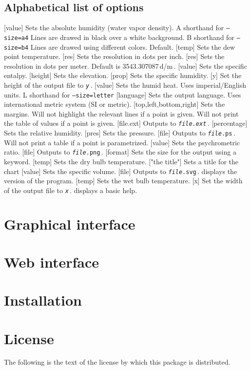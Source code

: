 \documentclass[letterpaper]{article}
\begin{document}
\subsection{Alphabetical list of options}
\begin{clioptions}
[value] Sets the absolute humidity (water vapor density).
\cliop A shorthand for \texttt{--size=a4}
 Lines are drawed in black over a white background.
\cliop B shorthand for \texttt{--size=b4}
 Lines are drawed using different colors. Default.
[temp] Sets the dew point temperature.
[res] Sets the resolution in dots per inch.
[res] Sets the resolution in dots per meter.
  Default is 3543.307087\,d/m\,.
[value] Sets the specific entalpy.
[height] Sets the elevation.
[prop] Sets the specific humidity.
[y] Set the height of the output file to \texttt{\textit{y}}\,.
[value] Sets the humid heat.
 Uses imperial/English units.
\cliop L shorthand for \texttt{--size=letter}
[language] Sets the output language.
 Uses international metric system (SI or metric).
[top,left,bottom,right] Sets the margins.
 Will not highlight the relevant lines if a point is given.
 Will not print the table of values if a point is given.
[file.ext] Outputs to \texttt{\textit{file.ext}}\,.
[percentage] Sets the relative humidity.
[pres] Sets the pressure.
[file] Outputs to \texttt{\textit{file}.ps}\,.
 Will not print a table if a point is parametrized.
[value] Sets the psychrometric ratio.
[file] Outputs to \texttt{\textit{file}.png}\,.
[format] Sets the size for the output using a keyword.
[temp] Sets the dry bulb temperature.
["the title"] Sets a title for the chart
[value] Sets the specific volume.
[file] Outputs to \texttt{\textit{file}.svg}\,.
 displays the version of the program.
[temp] Sets the wet bulb temperature.
[x] Set the width of the output file to \texttt{\textit{x}}\,.
 displays a basic help.
\end{clioptions}
\section{Graphical interface}
\section{Web interface}
\section{Installation}
\section{License}
The following is the text of the license by which this package is distributed.

\end{document}
